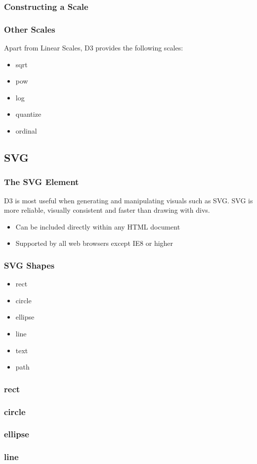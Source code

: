 \documentclass[red]{beamer}
\begin{document}
\begin{frame}
  \frametitle{Constructing a Scale}
  \lstll
\end{frame}

\begin{frame}
  \frametitle{Other Scales}
  Apart from Linear Scales, D3 provides the following scales:
  \begin{itemize}
  \item<1->sqrt
  \item<2->pow
  \item<3->log
  \item<4->quantize
  \item<5->ordinal
  \end{itemize}
\end{frame}

\subsection{SVG}

\begin{frame}
    \frametitle{The SVG Element}
    D3 is most useful when generating and manipulating visuals such as SVG. SVG is more reliable, visually consistent and faster than drawing with divs. 
    \newline
    \begin{itemize}
    \item<1-> Can be included directly within any HTML document
    \item<2-> Supported by all web browsers except IE8 or higher
    \end{itemize}
\end{frame}

\begin{frame}
  \frametitle{SVG Shapes}
  \begin{itemize}
    \item<1 -> rect
    \item<2 -> circle
    \item<3 -> ellipse
    \item<4 -> line
    \item<5 -> text
    \item<6 -> path
  \end{itemize}
\end{frame}

\begin{frame}
  \frametitle{rect}
  \lstrect
\end{frame}

\begin{frame}
  \frametitle{circle}
  \lstcircle
\end{frame}

\begin{frame}
  \frametitle{ellipse}
  \lstellipse
\end{frame}

\begin{frame}
  \frametitle{line}
  \lstline
\end{frame}
\end{document}
